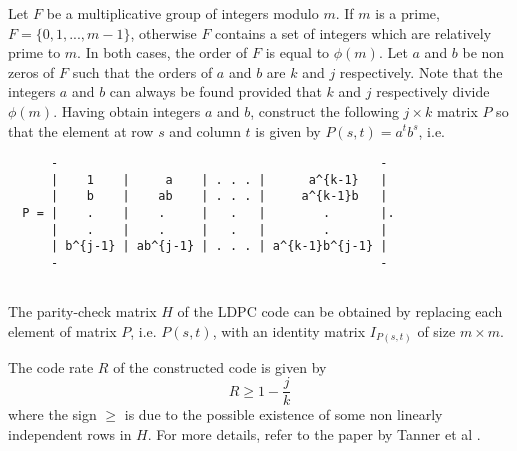 \documentclass[a4paper,11pt]{report}
\begin{document}
{{{ Let $F$ be a multiplicative group of integers modulo $m$. If $m$ is a prime, $F=\{0,1,...,m-1\}$, otherwise $F$ contains a set of integers which are relatively prime to $m$. In both cases, the order of $F$ is equal to $\phi(m)$. Let $a$ and $b$ be non zeros of $F$ such that the orders of $a$ and $b$ are $k$ and $j$ respectively. Note that the integers $a$ and $b$ can always be found provided that $k$ and $j$ respectively divide $\phi(m)$. Having obtain integers $a$ and $b$, construct the following $j \times k$ matrix $P$ so that the element at row $s$ and column $t$ is given by $P(s,t) = a^tb^s$, i.e. 
\begin{verbatim}  
      -                                             -
      |    1    |     a    | . . . |      a^{k-1}   |
      |    b    |    ab    | . . . |     a^{k-1}b   |
  P = |    .    |    .     |   .   |        .       |.
      |    .    |    .     |   .   |        .       |
      | b^{j-1} | ab^{j-1} | . . . | a^{k-1}b^{j-1} |
      -                                             -
  		
\end{verbatim}
 The parity-check matrix $H$ of the LDPC code can be obtained by replacing each element of matrix $P$, i.e. $P(s,t)$, with an identity matrix $I_{P(s,t)}$ of size $m \times m$. 

 The code rate $R$ of the constructed code is given by 
\[ R \geq 1 - \frac{j}{k} \]
 where the sign $\geq$ is due to the possible existence of some non linearly independent rows in $H$. For more details, refer to the paper by Tanner et al \cite{TSSFC04}. }

}}
\end{document}
